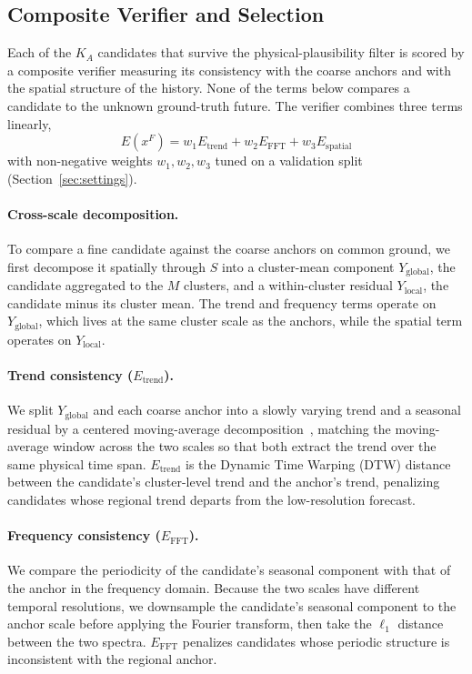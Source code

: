 \documentclass[preprint,12pt]{elsarticle}
\begin{document}
\subsection{Composite Verifier and Selection}
\label{sec:reward}

Each of the $K_A$ candidates that survive the physical-plausibility filter is scored by a composite verifier measuring its consistency with the coarse anchors and with the spatial structure of the history. None of the terms below compares a candidate to the unknown ground-truth future. The verifier combines three terms linearly,
\begin{equation}
E(x^F) = w_1 E_{\text{trend}} + w_2 E_{\text{FFT}} + w_3 E_{\text{spatial}}
\label{eq:reward}
\end{equation}
with non-negative weights $w_1, w_2, w_3$ tuned on a validation split (Section~\ref{sec:settings}).

\paragraph{Cross-scale decomposition.} To compare a fine candidate against the coarse anchors on common ground, we first decompose it spatially through $S$ into a cluster-mean component $Y_{\text{global}}$, the candidate aggregated to the $M$ clusters, and a within-cluster residual $Y_{\text{local}}$, the candidate minus its cluster mean. The trend and frequency terms operate on $Y_{\text{global}}$, which lives at the same cluster scale as the anchors, while the spatial term operates on $Y_{\text{local}}$.

\paragraph{Trend consistency ($E_{\text{trend}}$).} We split $Y_{\text{global}}$ and each coarse anchor into a slowly varying trend and a seasonal residual by a centered moving-average decomposition~\citep{wu2021autoformer}, matching the moving-average window across the two scales so that both extract the trend over the same physical time span. $E_{\text{trend}}$ is the Dynamic Time Warping (DTW) distance between the candidate's cluster-level trend and the anchor's trend, penalizing candidates whose regional trend departs from the low-resolution forecast.

\paragraph{Frequency consistency ($E_{\text{FFT}}$).} We compare the periodicity of the candidate's seasonal component with that of the anchor in the frequency domain. Because the two scales have different temporal resolutions, we downsample the candidate's seasonal component to the anchor scale before applying the Fourier transform, then take the $\ell_1$ distance between the two spectra. $E_{\text{FFT}}$ penalizes candidates whose periodic structure is inconsistent with the regional anchor.
\end{document}
